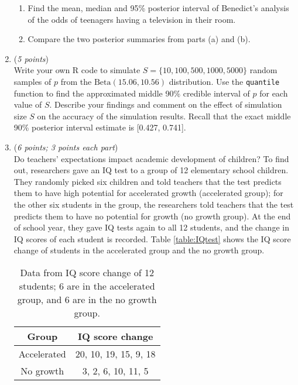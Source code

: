 \documentclass[11pt]{article}
\begin{document}
\begin{enumerate}
\begin{enumerate}
\item Find the mean, median and 95\% posterior interval of Benedict's analysis of the odds of teenagers having a television in their room.

\item Compare the two posterior summaries from parts (a) and (b).
\end{enumerate}


	\item
	({\it{5 points}}) \\
	Write your own R code to simulate $S = \{10, 100, 500, 1000, 5000\}$ random samples of $p$ from the $\textrm{Beta}(15.06, 10.56)$ distribution. Use the \texttt{quantile} function to find the approximated middle 90\% credible interval of $p$ for each value of $S$. Describe your findings and comment on the effect of simulation size $S$ on the accuracy of the simulation results. Recall that the exact middle 90\% posterior interval estimate is [0.427, 0.741].


	\item
	({\it{6 points; 3 points each part}}) \\
Do teachers' expectations impact academic development of children? To find out, researchers gave an IQ test to a group of 12 elementary school children. They randomly picked six children and told teachers that the test predicts them to have high potential for accelerated growth (accelerated group); for the other six students in the group, the researchers told teachers that the test predicts them to have no potential for growth (no growth group). At the end of school year, they gave IQ tests again to all 12 students, and the change in IQ scores of each student is recorded. Table \ref{table:IQtest} shows the IQ score change of students in the accelerated group and the no growth group.

\begin{table}[htb]
\caption{\label{table:IQtest} Data from IQ score change of 12 students; 6 are in the accelerated group, and 6 are in the no growth group.}
\begin{center}
\begin{tabular}{|c|c|} \hline
Group & IQ score change \\ \hline
Accelerated & 20, 10, 19, 15, 9, 18 \\
No growth &  3, 2, 6, 10, 11, 5\\ \hline
\end{tabular}
\end{center}
\label{default}
\end{table}%


\end{enumerate}
\end{document}
